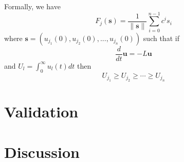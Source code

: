 \documentclass[10pt]{article}
\theoremstyle{definition}
\numberwithin{theorem}{section}
\numberwithin{definition}{section}
\numberwithin{lemma}{section}
\numberwithin{corollary}{section}
\numberwithin{clm}{section}
\numberwithin{rmk}{section}
\renewcommand{\b}{\bm}
\begin{document}
Formally, we have
\[
F_j(\b{s}) =\frac{1}{\|\b{s}\|} \sum_{i=0}^{n-1} c^i s_i
\]
where $\b{s} = (u_{j_1}(0),u_{j_2}(0),...,u_{j_n}(0))$ such that if 
\[
\frac{d}{dt}\b{u} = -L\b{u}
\]
and $U_l = \int_0^{\infty} u_l(t) dt$ then
\[
U_{j_1} \geq U_{j_2} \geq \cdots \geq U_{j_n}
\]

\section{Validation}

\section{Discussion}



\end{document}
